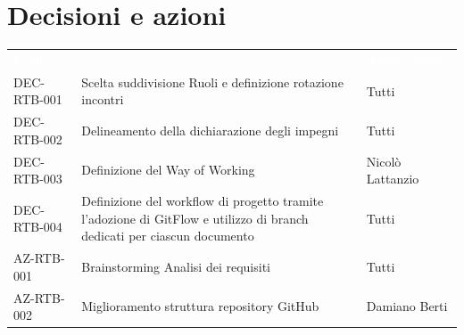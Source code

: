 \documentclass[a4paper, 11pt]{article}
\begin{document}
\section{Decisioni e azioni}
\begin{center}
    \begin{tabular}{>{\centering\arraybackslash}m{2cm} >{\raggedright\arraybackslash}p{8cm} >{\centering\arraybackslash}p{2.5cm}}
        \rowcolor{AccentColor}
        \textcolor{white}{\textbf{Codice}} & 
        \multicolumn{1}{c}{\textcolor{white}{\textbf{Descrizione}}} & 
        \textcolor{white}{\textbf{Assegnatario}} \\
        
        DEC-RTB-001 & Scelta suddivisione Ruoli e definizione rotazione incontri& Tutti \\
        DEC-RTB-002 & Delineamento della dichiarazione degli impegni & Tutti \\
        DEC-RTB-003 & Definizione del Way of Working & Nicolò Lattanzio \\
        DEC-RTB-004 & Definizione del workflow di progetto tramite l'adozione di GitFlow e utilizzo di branch dedicati per ciascun documento & Tutti \\
        
        \midrule
        
        AZ-RTB-001 & Brainstorming Analisi dei requisiti & Tutti \\
        AZ-RTB-002 & Miglioramento struttura repository GitHub & Damiano Berti \\

    \end{tabular}
\end{center}
\end{document}
